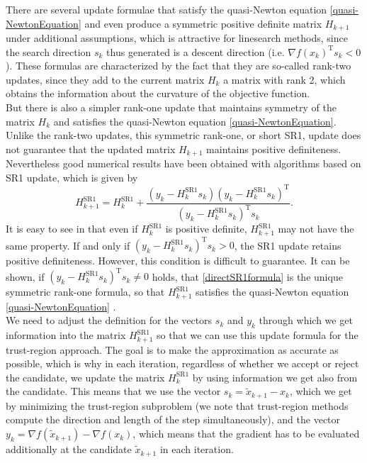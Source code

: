 There are several update formulae that satisfy the quasi-Newton equation \cref{quasi-NewtonEquation} and even produce a symmetric positive definite matrix $H_{k+1}$ under additional assumptions, which is attractive for linesearch methods, since the search direction $s_k$ thus generated is a descent direction (i.e. $\nabla f(x_k)^{\mathrm{T}} s_k < 0$). These formulas are characterized by the fact that they are so-called rank-two updates, since they add to the current matrix $H_k$ a matrix with rank 2, which obtains the information about the curvature of the objective function. \\
But there is also a simpler rank-one update that maintains symmetry of the matrix $H_k$ and satisfies the quasi-Newton equation \cref{quasi-NewtonEquation}. Unlike the rank-two updates, this symmetric rank-one, or short SR1, update does not guarantee that the updated matrix $H_{k+1}$ maintains positive definiteness. Nevertheless good numerical results have been obtained with algorithms based on SR1 update, which is given by
\begin{equation}\label{directSR1formula}
    H^\mathrm{SR1}_{k+1} = H^\mathrm{SR1}_k + \frac{(y_k - H^\mathrm{SR1}_k s_k) (y_k - H^\mathrm{SR1}_k s_k)^{\mathrm{T}}}{(y_k - H^\mathrm{SR1}_k s_k)^{\mathrm{T}} s_k}.
\end{equation}
It is easy to see in that even if $H^\mathrm{SR1}_k$ is positive definite, $H^\mathrm{SR1}_{k+1}$ may not have the same property. If and only if $(y_k - H^\mathrm{SR1}_k s_k)^{\mathrm{T}} s_k > 0$, the SR1 update retains positive definiteness. However, this condition is difficult to guarantee. It can be shown, if $(y_k - H^\mathrm{SR1}_k s_k)^{\mathrm{T}} s_k \neq 0$ holds, that \cref{directSR1formula} is the unique symmetric rank-one formula, so that $H^\mathrm{SR1}_{k+1}$ satisfies the quasi-Newton equation \cref{quasi-NewtonEquation} \cite[p.~144-145]{NocedalWright:2006}. \\

We need to adjust the definition for the vectors $s_k$ and $y_k$ through which we get information into the matrix $H^\mathrm{SR1}_{k+1}$ so that we can use this update formula for the trust-region approach. The goal is to make the approximation as accurate as possible, which is why in each iteration, regardless of whether we accept or reject the candidate, we update the matrix $H^\mathrm{SR1}_k$ by using information we get also from the candidate. This means that we use the vector $s_k = \widetilde{x}_{k+1} - x_k$, which we get by minimizing the trust-region subproblem (we note that trust-region methods compute the direction and length of the step simultaneously), and the vector $y_k = \nabla f(\widetilde{x}_{k+1}) - \nabla f(x_k)$, which means that the gradient has to be evaluated additionally at the candidate $\widetilde{x}_{k+1}$ in each iteration. \\

